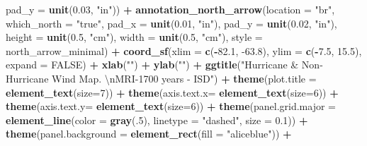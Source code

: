 \documentclass[12pt,twoside]{reedthesis}
\newenvironment{Shaded}{\begin{snugshade}}{\end{snugshade}}
\newcommand{\CharTok}[1]{\textcolor[rgb]{0.31,0.60,0.02}{#1}}
\newcommand{\DataTypeTok}[1]{\textcolor[rgb]{0.13,0.29,0.53}{#1}}
\newcommand{\DecValTok}[1]{\textcolor[rgb]{0.00,0.00,0.81}{#1}}
\newcommand{\FloatTok}[1]{\textcolor[rgb]{0.00,0.00,0.81}{#1}}
\newcommand{\KeywordTok}[1]{\textcolor[rgb]{0.13,0.29,0.53}{\textbf{#1}}}
\newcommand{\NormalTok}[1]{#1}
\newcommand{\OperatorTok}[1]{\textcolor[rgb]{0.81,0.36,0.00}{\textbf{#1}}}
\newcommand{\OtherTok}[1]{\textcolor[rgb]{0.56,0.35,0.01}{#1}}
\newcommand{\StringTok}[1]{\textcolor[rgb]{0.31,0.60,0.02}{#1}}
\begin{document}
\begin{Shaded}
\begin{Highlighting}[]
   \DataTypeTok{pad_y =} \KeywordTok{unit}\NormalTok{(}\FloatTok{0.03}\NormalTok{, }\StringTok{"in"}\NormalTok{)) }\OperatorTok{+}\StringTok{ }
\StringTok{  }\KeywordTok{annotation_north_arrow}\NormalTok{(}\DataTypeTok{location =} \StringTok{"br"}\NormalTok{, }\DataTypeTok{which_north =} \StringTok{"true"}\NormalTok{, }\DataTypeTok{pad_x =} \KeywordTok{unit}\NormalTok{(}\FloatTok{0.01}\NormalTok{, }\StringTok{"in"}\NormalTok{), }\DataTypeTok{pad_y =} \KeywordTok{unit}\NormalTok{(}\FloatTok{0.02}\NormalTok{, }\StringTok{"in"}\NormalTok{), }\DataTypeTok{height =} \KeywordTok{unit}\NormalTok{(}\FloatTok{0.5}\NormalTok{, }\StringTok{"cm"}\NormalTok{), }
   \DataTypeTok{width =} \KeywordTok{unit}\NormalTok{(}\FloatTok{0.5}\NormalTok{, }\StringTok{"cm"}\NormalTok{), }\DataTypeTok{style =}\NormalTok{ north_arrow_minimal) }\OperatorTok{+}
\StringTok{  }\KeywordTok{coord_sf}\NormalTok{(}\DataTypeTok{xlim =} \KeywordTok{c}\NormalTok{(}\OperatorTok{-}\FloatTok{82.1}\NormalTok{, }\FloatTok{-63.8}\NormalTok{), }\DataTypeTok{ylim =} \KeywordTok{c}\NormalTok{(}\OperatorTok{-}\FloatTok{7.5}\NormalTok{, }\FloatTok{15.5}\NormalTok{), }\DataTypeTok{expand =} \OtherTok{FALSE}\NormalTok{) }\OperatorTok{+}
\StringTok{  }\KeywordTok{xlab}\NormalTok{(}\StringTok{""}\NormalTok{) }\OperatorTok{+}\StringTok{ }
\StringTok{  }\KeywordTok{ylab}\NormalTok{(}\StringTok{""}\NormalTok{) }\OperatorTok{+}\StringTok{ }
\StringTok{  }\KeywordTok{ggtitle}\NormalTok{(}\StringTok{"Hurricane & Non-Hurricane Wind Map. }\CharTok{\textbackslash{}n}\StringTok{MRI-1700 years - ISD"}\NormalTok{) }\OperatorTok{+}\StringTok{ }
\StringTok{  }\KeywordTok{theme}\NormalTok{(}\DataTypeTok{plot.title =} \KeywordTok{element_text}\NormalTok{(}\DataTypeTok{size=}\DecValTok{7}\NormalTok{)) }\OperatorTok{+}
\StringTok{  }\KeywordTok{theme}\NormalTok{(}\DataTypeTok{axis.text.x=} \KeywordTok{element_text}\NormalTok{(}\DataTypeTok{size=}\DecValTok{6}\NormalTok{)) }\OperatorTok{+}\StringTok{ }
\StringTok{  }\KeywordTok{theme}\NormalTok{(}\DataTypeTok{axis.text.y=} \KeywordTok{element_text}\NormalTok{(}\DataTypeTok{size=}\DecValTok{6}\NormalTok{)) }\OperatorTok{+}
\StringTok{  }\KeywordTok{theme}\NormalTok{(}\DataTypeTok{panel.grid.major =} \KeywordTok{element_line}\NormalTok{(}\DataTypeTok{color =} \KeywordTok{gray}\NormalTok{(.}\DecValTok{5}\NormalTok{), }\DataTypeTok{linetype =} \StringTok{"dashed"}\NormalTok{, }\DataTypeTok{size =} \FloatTok{0.1}\NormalTok{)) }\OperatorTok{+}
\StringTok{  }\KeywordTok{theme}\NormalTok{(}\DataTypeTok{panel.background =} \KeywordTok{element_rect}\NormalTok{(}\DataTypeTok{fill =} \StringTok{"aliceblue"}\NormalTok{)) }\OperatorTok{+}

\end{Highlighting}
\end{Shaded}
\end{document}
